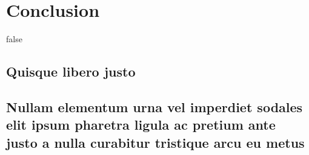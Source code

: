 \documentclass[
	12pt,				%
	openright,		nsubseteq	%
	twoside,			%
	a4paper,			%
	english,			%
	french,				%
	spanish,			%
	brazil				%
	]{abntex2}
\begin{document}
\part{Conclusion}




\postextual



%
%


\if false
\begin{apendicesenv}

\partapendices

\chapter{Quisque libero justo}

\lipsum[50]

\chapter{Nullam elementum urna vel imperdiet sodales elit ipsum pharetra ligula
ac pretium ante justo a nulla curabitur tristique arcu eu metus}
\lipsum[55-57]

\end{apendicesenv}

\fi
\end{document}
